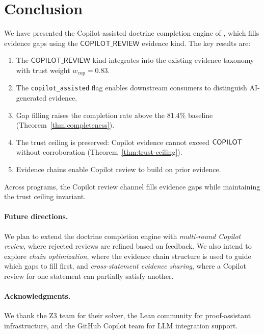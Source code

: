 \documentclass[11pt]{article}
\newcommand{\CopRev}{\mathsf{COPILOT\_REVIEW}}
\newcommand{\copweight}{w_{\mathrm{cop}}}
\begin{document}
\section{Conclusion}\label{sec:conclusion}

We have presented the Copilot-assisted doctrine completion engine of
\JuGeo{}, which fills evidence gaps using the $\CopRev$ evidence kind.
The key results are:

\begin{enumerate}[leftmargin=2em]
  \item The $\CopRev$ kind integrates into the existing evidence taxonomy
        with trust weight $\copweight = 0.83$.
  \item The \texttt{copilot\_assisted} flag enables downstream consumers to
        distinguish AI-generated evidence.
  \item Gap filling raises the completion rate above the 81.4\% baseline
        (Theorem~\ref{thm:completeness}).
  \item The trust ceiling is preserved: Copilot evidence cannot exceed
        $\mathsf{COPILOT}$ without corroboration (Theorem~\ref{thm:trust-ceiling}).
  \item Evidence chains enable Copilot review to build on prior evidence.
\end{enumerate}

Across \expTotalPrograms{} programs, the Copilot review channel fills
evidence gaps while maintaining the trust ceiling invariant.

\paragraph{Future directions.}
We plan to extend the doctrine completion engine with \emph{multi-round
Copilot review}, where rejected reviews are refined based on feedback.
We also intend to explore \emph{chain optimization}, where the evidence
chain structure is used to guide which gaps to fill first, and
\emph{cross-statement evidence sharing}, where a Copilot review for one
statement can partially satisfy another.

\paragraph{Acknowledgments.}
We thank the Z3 team for their solver, the Lean community for proof-assistant
infrastructure, and the GitHub Copilot team for LLM integration support.
\end{document}
